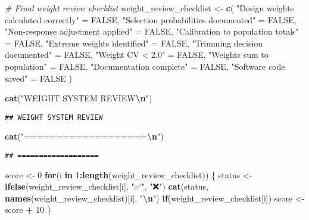 \documentclass[
]{article}
\newenvironment{Shaded}{\begin{snugshade}}{\end{snugshade}}
\newcommand{\CommentTok}[1]{\textcolor[rgb]{0.56,0.35,0.01}{\textit{#1}}}
\newcommand{\ConstantTok}[1]{\textcolor[rgb]{0.56,0.35,0.01}{#1}}
\newcommand{\ControlFlowTok}[1]{\textcolor[rgb]{0.13,0.29,0.53}{\textbf{#1}}}
\newcommand{\DecValTok}[1]{\textcolor[rgb]{0.00,0.00,0.81}{#1}}
\newcommand{\FunctionTok}[1]{\textcolor[rgb]{0.13,0.29,0.53}{\textbf{#1}}}
\newcommand{\NormalTok}[1]{#1}
\newcommand{\OtherTok}[1]{\textcolor[rgb]{0.56,0.35,0.01}{#1}}
\newcommand{\SpecialCharTok}[1]{\textcolor[rgb]{0.81,0.36,0.00}{\textbf{#1}}}
\newcommand{\StringTok}[1]{\textcolor[rgb]{0.31,0.60,0.02}{#1}}
\begin{document}
\begin{Shaded}
\begin{Highlighting}[]
\CommentTok{\# Final weight review checklist}
\NormalTok{weight\_review\_checklist }\OtherTok{\textless{}{-}} \FunctionTok{c}\NormalTok{(}
  \StringTok{"Design weights calculated correctly"} \OtherTok{=} \ConstantTok{FALSE}\NormalTok{,}
  \StringTok{"Selection probabilities documented"} \OtherTok{=} \ConstantTok{FALSE}\NormalTok{,}
  \StringTok{"Non{-}response adjustment applied"} \OtherTok{=} \ConstantTok{FALSE}\NormalTok{,}
  \StringTok{"Calibration to population totals"} \OtherTok{=} \ConstantTok{FALSE}\NormalTok{,}
  \StringTok{"Extreme weights identified"} \OtherTok{=} \ConstantTok{FALSE}\NormalTok{,}
  \StringTok{"Trimming decision documented"} \OtherTok{=} \ConstantTok{FALSE}\NormalTok{,}
  \StringTok{"Weight CV \textless{} 2.0"} \OtherTok{=} \ConstantTok{FALSE}\NormalTok{,}
  \StringTok{"Weights sum to population"} \OtherTok{=} \ConstantTok{FALSE}\NormalTok{,}
  \StringTok{"Documentation complete"} \OtherTok{=} \ConstantTok{FALSE}\NormalTok{,}
  \StringTok{"Software code saved"} \OtherTok{=} \ConstantTok{FALSE}
\NormalTok{)}

\FunctionTok{cat}\NormalTok{(}\StringTok{"WEIGHT SYSTEM REVIEW}\SpecialCharTok{\textbackslash{}n}\StringTok{"}\NormalTok{)}
\end{Highlighting}
\end{Shaded}

\begin{verbatim}
## WEIGHT SYSTEM REVIEW
\end{verbatim}

\begin{Shaded}
\begin{Highlighting}[]
\FunctionTok{cat}\NormalTok{(}\StringTok{"===================}\SpecialCharTok{\textbackslash{}n}\StringTok{"}\NormalTok{)}
\end{Highlighting}
\end{Shaded}

\begin{verbatim}
## ===================
\end{verbatim}

\begin{Shaded}
\begin{Highlighting}[]
\NormalTok{score }\OtherTok{\textless{}{-}} \DecValTok{0}
\ControlFlowTok{for}\NormalTok{(i }\ControlFlowTok{in} \DecValTok{1}\SpecialCharTok{:}\FunctionTok{length}\NormalTok{(weight\_review\_checklist)) \{}
\NormalTok{  status }\OtherTok{\textless{}{-}} \FunctionTok{ifelse}\NormalTok{(weight\_review\_checklist[i], }\StringTok{"✅"}\NormalTok{, }\StringTok{"❌"}\NormalTok{)}
  \FunctionTok{cat}\NormalTok{(status, }\FunctionTok{names}\NormalTok{(weight\_review\_checklist)[i], }\StringTok{"}\SpecialCharTok{\textbackslash{}n}\StringTok{"}\NormalTok{)}
  \ControlFlowTok{if}\NormalTok{(weight\_review\_checklist[i]) score }\OtherTok{\textless{}{-}}\NormalTok{ score }\SpecialCharTok{+} \DecValTok{10}
\NormalTok{\}}
\end{Highlighting}
\end{Shaded}
\end{document}
